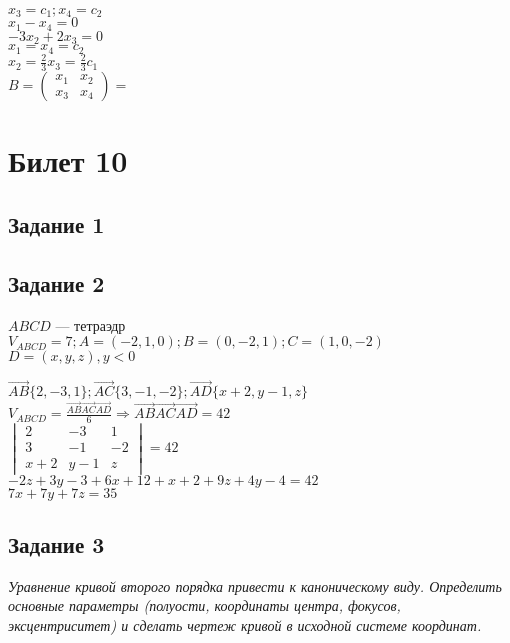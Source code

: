 \documentclass[a4paper]{article}
\theoremstyle{definition}
\theoremstyle{plain}
\begin{document}
$
x_{3} = c_{1}; x_{4} = c_{2}
$\\
$
x_{1} - x_{4} = 0
$\\
$
-3x_{2} + 2x_{3} = 0
$\\
$
x_{1} = x_{4} = c_{2}
$\\
$
x_{2} = \frac{2}{3}x_{3} = \frac{2}{3}c_{1}
$\\
$
B =
\begin{pmatrix}
  x_{1} & x_{2}\\
  x_{3} & x_{4}
\end{pmatrix}
=
$

\section*{Билет 10}
\subsection*{Задание 1}
\subsection*{Задание 2}
$ABCD$ --- тетраэдр\\
$V_{ABCD} = 7; A = (-2,1,0); B = (0, -2, 1); C = (1, 0, -2)$\\
$D = (x, y, z), y < 0$

$\vec{AB}\{2, -3, 1\}; \vec{AC}\{3, -1, -2\}; \vec{AD}\{x + 2, y - 1, z\}$\\
$V_{ABCD} = \frac{\vec{AB}\vec{AC}\vec{AD}}{6} \Rightarrow \vec{AB}\vec{AC}\vec{AD} = 42$\\
$\begin{vmatrix}
  2 & -3 & 1\\
  3 & -1 & -2\\
  x+2 & y-1 & z
\end{vmatrix}
= 42$\\
$-2z + 3y - 3 + 6x + 12 + x + 2 + 9z + 4y - 4 = 42$\\
$7x + 7y + 7z = 35$\\
\subsection*{Задание 3}

\emph{Уравнение кривой второго порядка привести к каноническому виду.
Определить основные параметры (полуости, координаты центра, фокусов, эксцентриситет) и сделать чертеж кривой в исходной системе координат.}
\end{document}
